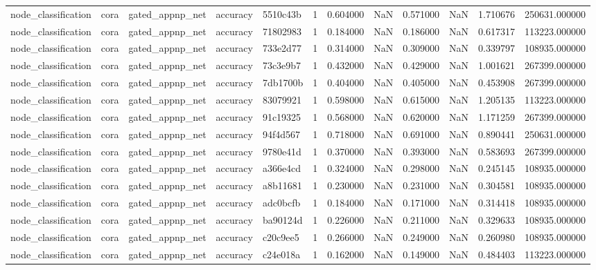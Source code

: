 \begin{tabular}{lllllrrrrrrr}
node_classification & cora & gated_appnp_net & accuracy & 5510c43b & 1 & 0.604000 & NaN & 0.571000 & NaN & 1.710676 & 250631.000000 \\
node_classification & cora & gated_appnp_net & accuracy & 71802983 & 1 & 0.184000 & NaN & 0.186000 & NaN & 0.617317 & 113223.000000 \\
node_classification & cora & gated_appnp_net & accuracy & 733e2d77 & 1 & 0.314000 & NaN & 0.309000 & NaN & 0.339797 & 108935.000000 \\
node_classification & cora & gated_appnp_net & accuracy & 73c3e9b7 & 1 & 0.432000 & NaN & 0.429000 & NaN & 1.001621 & 267399.000000 \\
node_classification & cora & gated_appnp_net & accuracy & 7db1700b & 1 & 0.404000 & NaN & 0.405000 & NaN & 0.453908 & 267399.000000 \\
node_classification & cora & gated_appnp_net & accuracy & 83079921 & 1 & 0.598000 & NaN & 0.615000 & NaN & 1.205135 & 113223.000000 \\
node_classification & cora & gated_appnp_net & accuracy & 91c19325 & 1 & 0.568000 & NaN & 0.620000 & NaN & 1.171259 & 267399.000000 \\
node_classification & cora & gated_appnp_net & accuracy & 94f4d567 & 1 & 0.718000 & NaN & 0.691000 & NaN & 0.890441 & 250631.000000 \\
node_classification & cora & gated_appnp_net & accuracy & 9780e41d & 1 & 0.370000 & NaN & 0.393000 & NaN & 0.583693 & 267399.000000 \\
node_classification & cora & gated_appnp_net & accuracy & a366e4cd & 1 & 0.324000 & NaN & 0.298000 & NaN & 0.245145 & 108935.000000 \\
node_classification & cora & gated_appnp_net & accuracy & a8b11681 & 1 & 0.230000 & NaN & 0.231000 & NaN & 0.304581 & 108935.000000 \\
node_classification & cora & gated_appnp_net & accuracy & adc0bcfb & 1 & 0.184000 & NaN & 0.171000 & NaN & 0.314418 & 108935.000000 \\
node_classification & cora & gated_appnp_net & accuracy & ba90124d & 1 & 0.226000 & NaN & 0.211000 & NaN & 0.329633 & 108935.000000 \\
node_classification & cora & gated_appnp_net & accuracy & c20c9ee5 & 1 & 0.266000 & NaN & 0.249000 & NaN & 0.260980 & 108935.000000 \\
node_classification & cora & gated_appnp_net & accuracy & c24e018a & 1 & 0.162000 & NaN & 0.149000 & NaN & 0.484403 & 113223.000000 \\

\end{tabular}
